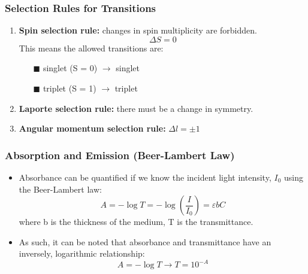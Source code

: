 \documentclass[12pt, letterpaper, twoside]{article}
\begin{document}
\subsubsection{Selection Rules for Transitions}
\begin{enumerate}
    \item \textbf{Spin selection rule:} changes in spin multiplicity are forbidden.
    \begin{equation*}
        \Delta S = 0
    \end{equation*}
    This means the allowed transitions are:
    \begin{itemize}
        \item[$\blacksquare$] singlet (S = 0) $\rightarrow$ singlet
        \item[$\blacksquare$] triplet (S = 1) $\rightarrow$ triplet
    \end{itemize}
    \item \textbf{Laporte selection rule:} there must be a change in symmetry.
    \item \textbf{Angular momentum selection rule:} $\Delta l = \pm1$
\end{enumerate}
\subsubsection{Absorption and Emission (Beer-Lambert Law)}

\begin{itemize}
    \item Absorbance can be quantified if we know the incident light intensity, $I_0$ using the Beer-Lambert law:
    \begin{equation}
        A = -\log T =  -\log(\frac{I}{I_0}) = \varepsilon bC
    \end{equation}
    where b is the thickness of the medium, T is the transmittance.
    \item As such, it can be noted that absorbance and transmittance have an inversely, logarithmic relationship:
    \begin{equation}
        A = -\log T \rightarrow T = 10^{-A}
    \end{equation}
\end{itemize}
\end{document}

